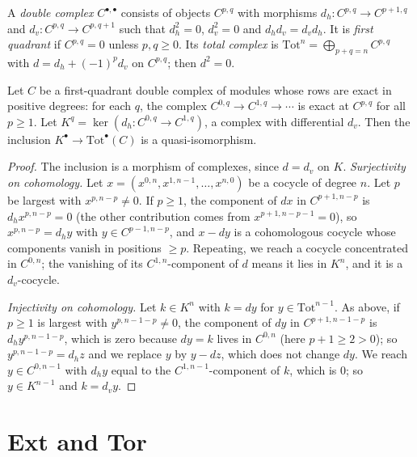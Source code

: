 \begin{definition}\label{homological-algebra:definition-double-complex}
A \emph{double complex} $C^{\bullet,\bullet}$ consists of objects $C^{p,q}$ with morphisms
$d_h \colon C^{p,q} \to C^{p+1,q}$ and $d_v \colon C^{p,q} \to C^{p,q+1}$ such that $d_h^2 = 0$, $d_v^2 = 0$ and $d_hd_v = d_vd_h$. It is
\emph{first quadrant} if $C^{p,q} = 0$ unless $p, q \geq 0$. Its \emph{total complex} is
$\mathrm{Tot}^n = \bigoplus_{p+q=n}C^{p,q}$ with $d = d_h + (-1)^pd_v$ on $C^{p,q}$; then $d^2 = 0$.
\end{definition}

\begin{lemma}\label{homological-algebra:lemma-acyclic-assembly}
Let $C$ be a first-quadrant double complex of modules whose rows are exact in positive degrees: for each $q$, the complex
$C^{0,q} \to C^{1,q} \to \cdots$ is exact at $C^{p,q}$ for all $p \geq 1$. Let $K^q = \ker(d_h \colon C^{0,q} \to C^{1,q})$, a complex with
differential $d_v$. Then the inclusion $K^\bullet \to \mathrm{Tot}^\bullet(C)$ is a quasi-isomorphism.
\end{lemma}

\begin{proof}
The inclusion is a morphism of complexes, since $d = d_v$ on $K$. \emph{Surjectivity on cohomology.} Let
$x = (x^{0,n}, x^{1,n-1}, \ldots, x^{n,0})$ be a cocycle of degree $n$. Let $p$ be largest with $x^{p,n-p} \neq 0$. If $p \geq 1$, the
component of $dx$ in $C^{p+1,n-p}$ is $d_hx^{p,n-p} = 0$ (the other contribution comes from $x^{p+1, n-p-1} = 0$), so
$x^{p,n-p} = d_hy$ with $y \in C^{p-1,n-p}$, and $x - dy$ is a cohomologous cocycle whose components vanish in positions
$\geq p$. Repeating, we reach a cocycle concentrated in $C^{0,n}$; the vanishing of its $C^{1,n}$-component of $d$ means it
lies in $K^n$, and it is a $d_v$-cocycle.

\emph{Injectivity on cohomology.} Let $k \in K^n$ with $k = dy$ for $y \in \mathrm{Tot}^{n-1}$. As above, if $p \geq 1$ is largest with
$y^{p,n-1-p} \neq 0$, the component of $dy$ in $C^{p+1,n-1-p}$ is $d_hy^{p,n-1-p}$, which is zero because $dy = k$ lives in
$C^{0,n}$ (here $p + 1 \geq 2 > 0$); so $y^{p,n-1-p} = d_hz$ and we replace $y$ by $y - dz$, which does not change $dy$. We reach
$y \in C^{0,n-1}$ with $d_hy$ equal to the $C^{1,n-1}$-component of $k$, which is $0$; so $y \in K^{n-1}$ and $k = d_vy$.
\end{proof}

\section{Ext and Tor}\label{homological-algebra:section-ext-tor}

